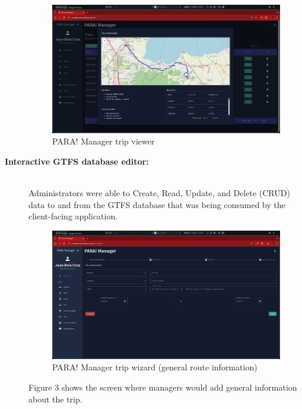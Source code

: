 \documentclass[journal]{./IEEE/IEEEtran}
\begin{document}
\begin{description}
\begin{figure}[h]
    \centering
        \includegraphics[scale=0.115]{./figures/manager/view trip.jpeg}
    \caption{PARA! Manager trip viewer}
\end{figure}

    \item[\textbf{Interactive GTFS database editor:}] \hfill \\
        Administrators were able to Create, Read, Update, and Delete (CRUD) data to and from the GTFS database that was being consumed by the client-facing application.

\begin{figure}[!h]
    \centering
        \includegraphics[scale=0.115]{./figures/manager/trip wizard 1.jpeg}
    \caption{PARA! Manager trip wizard (general route information)}
\end{figure}

Figure 3 shows the screen where managers would add general information about the trip.


\end{description}
\end{document}
